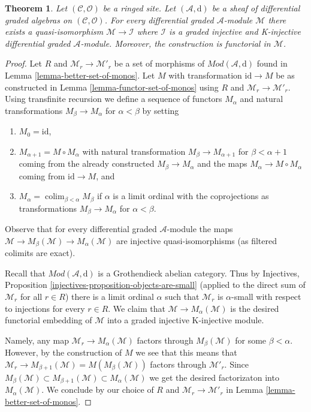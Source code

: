 \documentclass[10pt,a4paper]{amsart}
\theoremstyle{plain}
\newtheorem{theorem}[subsection]{Theorem}
\theoremstyle{definition}
\theoremstyle{remark}
\numberwithin{equation}{subsection}
\def\colim{\mathop{\mathrm{colim}}\nolimits}
\begin{document}
\begin{theorem}
\label{theorem-qis-into-dg-injective}
Let $(\mathcal{C}, \mathcal{O})$ be a ringed site.
Let $(\mathcal{A}, \text{d})$
be a sheaf of differential graded algebras on $(\mathcal{C}, \mathcal{O})$.
For every differential graded $\mathcal{A}$-module $\mathcal{M}$ there
exists a quasi-isomorphism $\mathcal{M} \to \mathcal{I}$
where $\mathcal{I}$ is a graded injective and K-injective
differential graded $\mathcal{A}$-module. Moreover, the
construction is functorial in $\mathcal{M}$.
\end{theorem}

\begin{proof}
Let $R$ and $\mathcal{M}_r \to \mathcal{M}'_r$ be a set of
morphisms of $\textit{Mod}(\mathcal{A}, \text{d})$ found in
Lemma \ref{lemma-better-set-of-monos}.
Let $M$ with transformation $\text{id} \to M$
be as constructed in Lemma \ref{lemma-functor-set-of-monos}
using $R$ and $\mathcal{M}_r \to \mathcal{M}'_r$.
Using transfinite recursion we define a sequence of functors
$M_\alpha$ and natural transformations $M_\beta \to M_\alpha$
for $\alpha < \beta$ by setting
\begin{enumerate}
\item $M_0 = \text{id}$,
\item $M_{\alpha + 1} = M \circ M_\alpha$ with natural transformation
$M_\beta \to M_{\alpha + 1}$ for $\beta < \alpha + 1$
coming from the already constructed $M_\beta \to M_\alpha$ and the
maps $M_\alpha \to M \circ M_\alpha$ coming from $\text{id} \to M$, and
\item $M_\alpha = \colim_{\beta < \alpha} M_\beta$ if $\alpha$
is a limit ordinal with the coprojections as transformations
$M_\beta \to M_\alpha$ for $\alpha < \beta$.
\end{enumerate}
Observe that for every differential graded $\mathcal{A}$-module the maps
$\mathcal{M} \to M_\beta(\mathcal{M}) \to M_\alpha(\mathcal{M})$
are injective quasi-isomorphisms (as filtered colimits are exact).

\medskip\noindent
Recall that $\textit{Mod}(\mathcal{A}, \text{d})$ is a Grothendieck
abelian category. Thus by
Injectives, Proposition \ref{injectives-proposition-objects-are-small}
(applied to the direct sum of $\mathcal{M}_r$ for all $r \in R$)
there is a limit ordinal $\alpha$ such that $\mathcal{M}_r$ is $\alpha$-small
with respect to injections for every $r \in R$.
We claim that $\mathcal{M} \to M_\alpha(\mathcal{M})$ is
the desired functorial embedding of $\mathcal{M}$ into a
graded injective K-injective module.

\medskip\noindent
Namely, any map $\mathcal{M}_r \to M_\alpha(\mathcal{M})$
factors through $M_\beta(\mathcal{M})$ for some $\beta < \alpha$.
However, by the construction of $M$ we see that this means
that $\mathcal{M}_r \to M_{\beta + 1}(\mathcal{M}) = M(M_\beta(\mathcal{M}))$
factors through $\mathcal{M}'_r$. Since
$M_\beta(\mathcal{M}) \subset  M_{\beta + 1}(\mathcal{M})
\subset M_\alpha(\mathcal{M})$ we get the desired factorizaton
into $M_\alpha(\mathcal{M})$. We conclude by our choice of
$R$ and $\mathcal{M}_r \to \mathcal{M}'_r$ in
Lemma \ref{lemma-better-set-of-monos}.
\end{proof}
\end{document}
